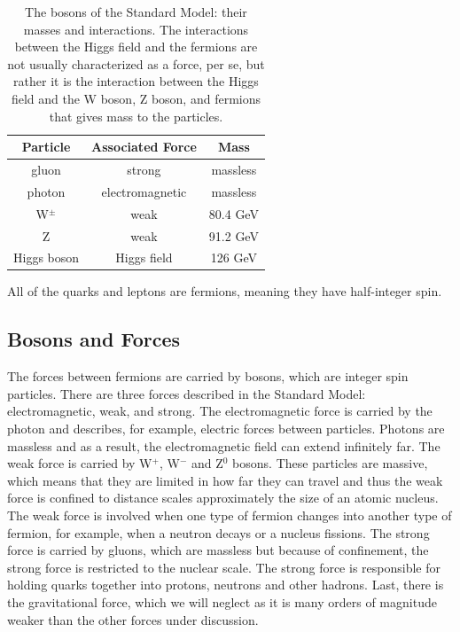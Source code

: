 \begin{table}
	\caption{The bosons of the Standard Model: their masses and interactions.   The interactions between the Higgs field and the fermions are not usually characterized as a force, per se, but rather it is the interaction between the Higgs field and the W boson, Z boson, and fermions that gives mass to the particles.  \label{tab:boson_table}}
    \center
	\begin{tabular}{| c || c | c |}
	\hline
	Particle & Associated Force & Mass \\
	\hline
	gluon & strong & massless \\
	photon & electromagnetic & massless \\
	W$^\pm$ & weak & 80.4 GeV \\
	Z & weak & 91.2 GeV \\ 
	Higgs boson & Higgs field & 126 GeV \\
	\hline
	\end{tabular}
\end{table}


All of the quarks and leptons are fermions, meaning they have half-integer spin.

\subsection{Bosons and Forces}

The forces between fermions are carried by bosons, which are integer spin particles.  There are three forces described in the Standard Model: electromagnetic, weak, and strong.  The electromagnetic force is carried by the photon and describes, for example, electric forces between particles.  Photons are massless and as a result, the electromagnetic field can extend infinitely far.  The weak force is carried by W$^+$, W$^-$ and Z$^0$ bosons.  These particles are massive, which means that they are limited in how far they can travel and thus the weak force is confined to distance scales approximately the size of an atomic nucleus.  The weak force is involved when one type of fermion changes into another type of fermion, for example, when a neutron decays or a nucleus fissions.  The strong force is carried by gluons, which are massless but because of confinement, the strong force is restricted to the nuclear scale.  The strong force is responsible for holding quarks together into protons, neutrons and other hadrons. Last, there is the gravitational force, which we will neglect as it is many orders of magnitude weaker than the other forces under discussion.

